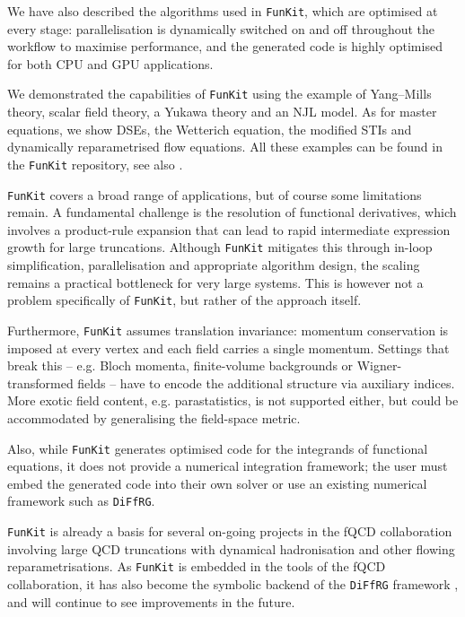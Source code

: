 \documentclass[preprint,10pt,sort&compress]{elsarticle}
\newcommand{\FunKit}{\texttt{FunKit}\xspace}
\newcommand{\DiFfRG}{\texttt{DiFfRG}\xspace}
\begin{document}
We have also described the algorithms used in \FunKit, which are optimised at every stage: parallelisation is dynamically switched on and off throughout the workflow to maximise performance, and the generated code is highly optimised for both CPU and GPU applications.

We demonstrated the capabilities of \FunKit using the example of Yang--Mills theory, scalar field theory, a Yukawa theory and an NJL model. As for master equations, we show DSEs, the Wetterich equation, the modified STIs and dynamically reparametrised flow equations. All these examples can be found in the \FunKit repository, see also .

\FunKit covers a broad range of applications, but of course some limitations remain.
A fundamental challenge is the resolution of functional derivatives, which involves a product-rule expansion that can lead to rapid intermediate expression growth for large truncations.
Although \FunKit mitigates this through in-loop simplification, parallelisation and appropriate algorithm design, the scaling remains a practical bottleneck for very large systems. This is however not a problem specifically of \FunKit, but rather of the approach itself.

Furthermore, \FunKit assumes translation invariance: momentum conservation is imposed at every vertex and each field carries a single momentum. Settings that break this -- e.g. Bloch momenta, finite-volume backgrounds or Wigner-transformed fields -- have to encode the additional structure via auxiliary indices.
More exotic field content, e.g. parastatistics, is not supported either, but could be accommodated by generalising the field-space metric.

Also, while \FunKit generates optimised code for the integrands of functional equations, it does not provide a numerical integration framework; the user must embed the generated code into their own solver or use an existing numerical framework such as \DiFfRG \cite{Sattler:2024ozv}.

\FunKit is already a basis for several on-going projects in the fQCD collaboration \cite{fQCD} involving large QCD truncations with dynamical hadronisation and other flowing reparametrisations.
As \FunKit is embedded in the tools of the fQCD collaboration, it has also become the symbolic backend of the \DiFfRG framework \cite{Sattler:2024ozv}, and will continue to see improvements in the future.


\end{document}
